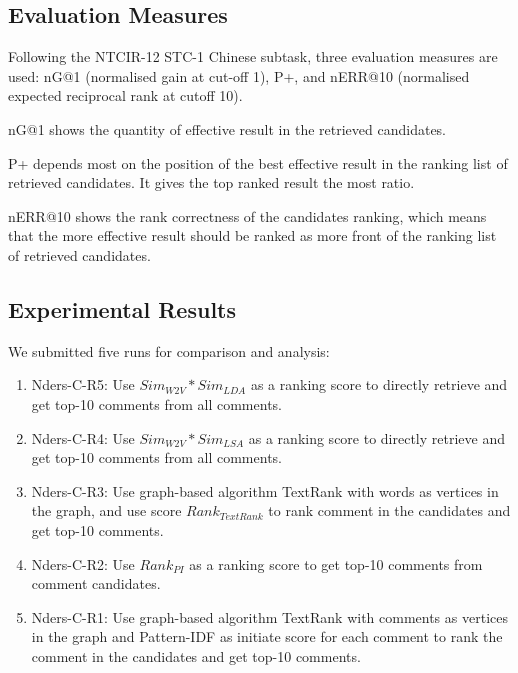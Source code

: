 \documentclass{sig-alternate}
\begin{document}
\subsection{Evaluation Measures}
Following the NTCIR-12 STC-1 Chinese subtask, three evaluation measures are
used: nG@1 (normalised gain at cut-off 1), P+, and nERR@10 (normalised expected reciprocal rank at cutoff 10)\cite{Lifeng}\cite{Lifeng-13}.

nG@1 shows the quantity of effective result in the retrieved candidates. 

P+ depends most on the position of the best effective result in the
ranking list of retrieved candidates. It gives the top ranked result
the most ratio. 

nERR@10 shows the rank correctness of the candidates ranking,
which means that the more effective result should be ranked as
more front of the ranking list of retrieved candidates.

\subsection{Experimental Results}
We submitted five runs for comparison and analysis:

\begin{enumerate}
  \item{Nders-C-R5: } Use $Sim_{W2V}*Sim_{LDA}$ as a ranking score to directly 
  retrieve and get top-10 comments from all comments.
  \item{Nders-C-R4: } Use $Sim_{W2V}*Sim_{LSA}$ as a ranking score to directly 
  retrieve and get top-10 comments from all comments.
  \item{Nders-C-R3: } Use graph-based algorithm TextRank with words as vertices
  in the graph, and use score $Rank_{TextRank}$ to rank comment in the 
  candidates and get top-10 comments.
  \item{Nders-C-R2: } Use $Rank_{PI}$ as a ranking score to get top-10 comments from comment candidates.
  \item{Nders-C-R1: } Use graph-based algorithm TextRank with comments as vertices in the graph and Pattern-IDF as initiate score for each comment to 
  rank the comment in the candidates and get top-10 comments.
\end{enumerate}
\end{document}
